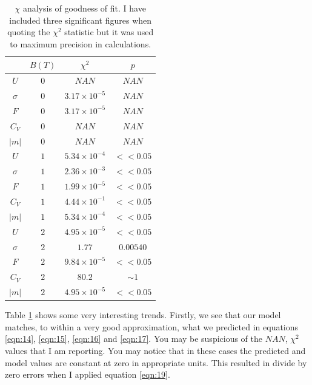 \documentclass[a4paper, twocolumn]{article}
\begin{document}
\begin{table}
    \centering
    \begin{tabular}{|c|c|c|c|}
        \hline
        & \(B (T)\) & \(\chi^{2}\) & \(p\) \\
        \hline
        \hline
        \(U\)      & \(0\) & \(NAN\)                 & \(NAN\) \\ 
        \(\sigma\) & \(0\) & \(3.17 \times 10^{-5}\) & \(NAN\) \\
        \(F\)      & \(0\) & \(3.17 \times 10^{-5}\) & \(NAN\) \\
        \(C_{V}\)  & \(0\) & \(NAN\)                 & \(NAN\) \\
        \(|m|\)    & \(0\) & \(NAN\)                 & \(NAN\) \\
        \hline
        \(U\)      & \(1\) & \(5.34 \times 10^{-4}\) & \(<< 0.05\) \\ 
        \(\sigma\) & \(1\) & \(2.36 \times 10^{-3}\) & \(<< 0.05\) \\
        \(F\)      & \(1\) & \(1.99 \times 10^{-5}\) & \(<< 0.05\) \\
        \(C_{V}\)  & \(1\) & \(4.44 \times 10^{-1}\) & \(<< 0.05\) \\
        \(|m|\)    & \(1\) & \(5.34 \times 10^{-4}\) & \(<< 0.05\) \\
        \hline
        \(U\)      & \(2\) & \(4.95 \times 10^{-5}\) & \(<< 0.05\) \\ 
        \(\sigma\) & \(2\) & \(1.77\)                & \(0.00540\) \\
        \(F\)      & \(2\) & \(9.84 \times 10^{-5}\) & \(<< 0.05\) \\
        \(C_{V}\)  & \(2\) & \(80.2\)                & \(\sim 1\)  \\
        \(|m|\)    & \(2\) & \(4.95 \times 10^{-5}\) & \(<< 0.05\) \\
        \hline
    \end{tabular}
    \caption{\(\chi\) analysis of goodness of fit. I have included %
        three significant figures when quoting the \(\chi^{2}\) %
        statistic but it was used to maximum precision in calculations.}
    \label{tab:1}
\end{table}


Table \ref{tab:1} shows some very interesting trends. Firstly, we see %
that our model matches, to within a very good approximation, what we %
predicted in equations \ref{eqn:14}, \ref{eqn:15}, \ref{eqn:16} and %
\ref{eqn:17}. You may be suspicious of the \(NAN\), \(\chi^{2}\) values %
that I am reporting. You may notice that in these cases the predicted %
and model values are constant at zero in appropriate units. This %
resulted in divide by zero errors when I applied equation \ref{eqn:19}.
\end{document}
